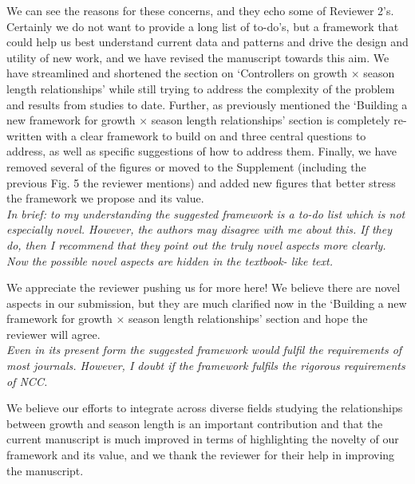 \documentclass[11pt]{article}
\begin{document}
We can see the reasons for these concerns, and they echo some of Reviewer 2's. Certainly we do not want to provide a long list of to-do's, but a framework that could help us best understand current data and patterns and drive the design and utility of new work, and we have revised the manuscript towards this aim. We have streamlined and shortened the section on `Controllers on growth $\times$ season length relationships' while still trying to address the complexity of the problem and results from studies to date. Further, as previously mentioned the  `Building a new framework for growth $\times$ season length relationships' section is completely re-written with a clear framework to build on and three central questions to address, as well as specific suggestions of how to address them. Finally, we have removed several of the figures or moved to the Supplement (including the previous Fig. 5 the reviewer mentions) and added new figures that better stress the framework we propose and its value. \\

\emph{In brief: to my understanding the suggested framework is a to-do list which is not especially novel. However, the authors may disagree with me about this. If they do, then I recommend that they point out the truly novel aspects more clearly. Now the possible novel aspects are hidden in the textbook- like text.}

We appreciate the reviewer pushing us for more here! We believe there are novel aspects in our submission, but they are much clarified now in the `Building a new framework for growth $\times$ season length relationships' section and hope the reviewer will agree. \\

\emph{Even in its present form the suggested framework would fulfil the requirements of most journals. However, I doubt if the framework fulfils the rigorous requirements of NCC.}

We believe our efforts to integrate across diverse fields studying the relationships between growth and season length is an important contribution and that the current manuscript is much improved in terms of highlighting the novelty of our framework and its value, and we thank the reviewer for their help in improving the manuscript.\\
\end{document}
